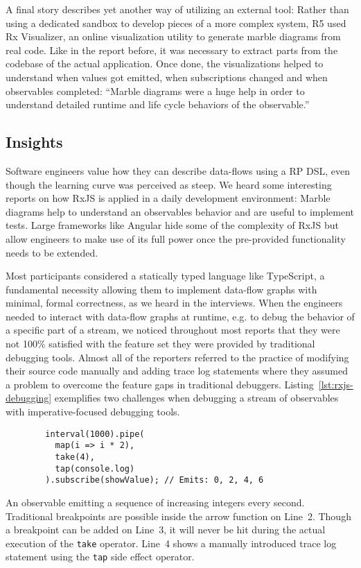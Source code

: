 \documentclass[sigplan,screen,review]{acmart}
\begin{document}
A final story describes yet another way of utilizing an external tool: Rather than using a dedicated sandbox to develop pieces of a more complex system, R5 used Rx Visualizer, an online visualization utility to generate marble diagrams from real code. Like in the report before, it was necessary to extract parts from the codebase of the actual application. Once done, the visualizations helped to understand when values got emitted, when subscriptions changed and when observables completed: ``Marble diagrams were a huge help in order to understand detailed runtime and life cycle behaviors of the observable.''

\subsection{Insights}

Software engineers value how they can describe data-flows using a RP DSL, even though the learning curve was perceived as steep. We heard some interesting reports on how RxJS is applied in a daily development environment: Marble diagrams help to understand  an observables behavior and are useful to implement tests. Large frameworks like Angular hide some of the complexity of RxJS but allow engineers to make use of its full power once the pre-provided functionality needs to be extended.

Most participants considered a statically typed language like TypeScript, a fundamental necessity allowing them to implement data-flow graphs with minimal, formal correctness, as we heard in the interviews. When the engineers needed to interact with data-flow graphs at runtime, e.g. to debug the behavior of a specific part of a stream, we noticed throughout most reports that they were not 100\% satisfied with the feature set they were provided by traditional debugging tools. Almost all of the reporters referred to the practice of modifying their source code manually and adding trace log statements where they assumed a problem to overcome the feature gaps in traditional debuggers. Listing~\ref{lst:rxjs-debugging} exemplifies two challenges when debugging a stream of observables with imperative-focused debugging tools.

\begin{listing}
	\begin{verbatim}
		interval(1000).pipe(
		  map(i => i * 2),
		  take(4),
		  tap(console.log)
		).subscribe(showValue); // Emits: 0, 2, 4, 6
	\end{verbatim}
	\caption{An observable emitting a sequence of increasing integers every second. Traditional breakpoints are possible inside the arrow function on Line~2. Though a breakpoint can be added on Line~3, it will never be hit during the actual execution of the \texttt{take} operator. Line~4 shows a manually introduced trace log statement using the \texttt{tap} side effect operator.}
	\label{lst:rxjs-debugging}
\end{listing}
\end{document}
